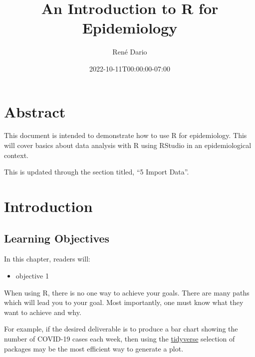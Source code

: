 \documentclass[
  letterpaper,
  DIV=11,
  numbers=noendperiod]{scrreprt}
\title{An Introduction to R for Epidemiology}
\author{René Dario}
\date{2022-10-11T00:00:00-07:00}
\providecommand{\tightlist}{%
  \setlength{\itemsep}{0pt}\setlength{\parskip}{0pt}}\usepackage{longtable,booktabs,array}
\renewcommand*\contentsname{Table of contents}
\newcommand\contentsname{Table of contents}
\begin{document}
\maketitle
\ifdefined\Shaded\renewenvironment{Shaded}{\begin{tcolorbox}[boxrule=0pt, interior hidden, borderline west={3pt}{0pt}{shadecolor}, enhanced, sharp corners, breakable, frame hidden]}{\end{tcolorbox}}\fi

\renewcommand*\contentsname{Table of contents}
{
\hypersetup{linkcolor=}
\setcounter{tocdepth}{2}
\tableofcontents
}

\hypertarget{abstract}{%
\chapter*{Abstract}\label{abstract}}

This document is intended to demonstrate how to use R for epidemiology.
This will cover basics about data analysis with R using RStudio in an
epidemiological context.

This is updated through the section titled, ``5 Import Data''.


\hypertarget{introduction}{%
\chapter{Introduction}\label{introduction}}

\hypertarget{learning-objectives}{%
\section{Learning Objectives}\label{learning-objectives}}

In this chapter, readers will:

\begin{itemize}
\tightlist
\item
  objective 1
\end{itemize}

When using R, there is no one way to achieve your goals. There are many
paths which will lead you to your goal. Most importantly, one must know
what they want to achieve and why.

For example, if the desired deliverable is to produce a bar chart
showing the number of COVID-19 cases each week, then using the
\href{https://www.tidyverse.org/}{tidyverse} selection of packages may
be the most efficient way to generate a plot.
\end{document}
